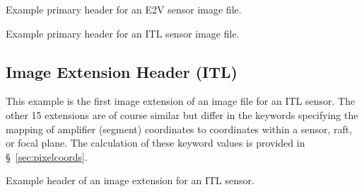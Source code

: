 \documentclass{article}[12pt]
\newcommand{\red}{\textcolor{red}}
\begin{document}

\begin{table}
\begin{alltt}

\end{alltt}
\caption{Example primary header for an E2V sensor image file.\label{tab:primary_E2V}}
\end{table}

\begin{table}
\begin{alltt}

\end{alltt}
\caption{Example primary header for an ITL sensor image file.\label{tab:primary_ITL}}
\end{table}

\subsection{Image Extension Header (ITL)}
This example is the first image extension of an image file for an ITL sensor.  The other 15 extensions are of course similar but differ in the keywords specifying the mapping of amplifier (segment) coordinates to coordinates within a sensor, raft, or focal plane.  The calculation of these keyword values is provided in \S~\ref{sec:pixelcoords}.

\begin{table}
\tiny
\begin{alltt}

\end{alltt}
\caption{Example header of an image extension for an ITL sensor. \label{tab:image_ITL}}
\end{table}
\end{document}
